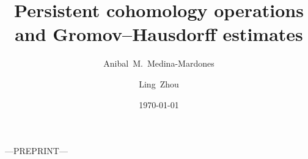 \documentclass{amsart}
\title[Persistent cohomology operations]{Persistent cohomology operations \\ and Gromov--Hausdorff estimates}
\author{Anibal~M.~Medina-Mardones}
\author{Ling~Zhou}
\date{\today}
\begin{document}
	\begin{center}
		---\textsc{PREPRINT}---
		\medskip
	\end{center}
	
	\maketitle
	\vspace*{-.8cm}
	\tableofcontents
	
	
	
	
	
	
	\sloppy
	\printbibliography
	\todos
\end{document}
